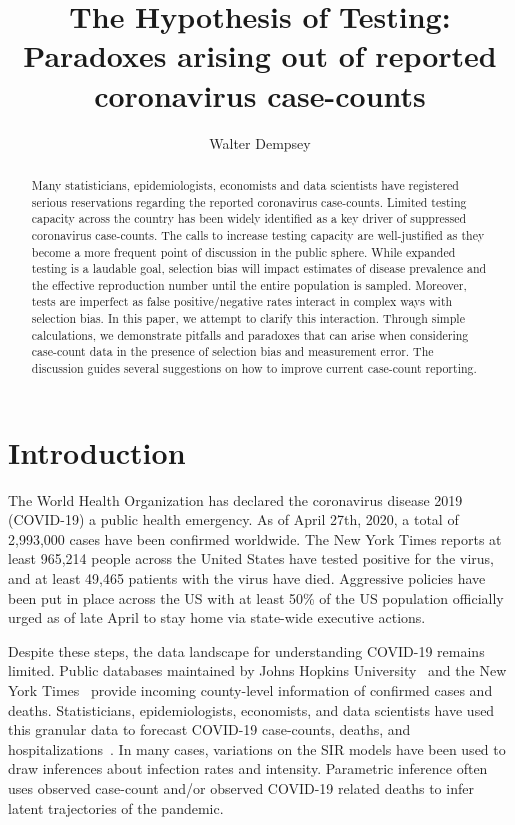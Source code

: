\documentclass[aoas]{amsart}
\begin{document}
\title[The Hypothesis of Testing]{The Hypothesis of Testing: Paradoxes arising out of reported coronavirus case-counts} %

\author{Walter Dempsey}
\address{Department of Biostatistics, University of Michigan, Ann Arbor, MI 48109}

\begin{abstract}
Many statisticians, epidemiologists, economists and data scientists have registered serious reservations regarding the reported coronavirus case-counts. Limited testing capacity across the country has been widely identified as a key driver of suppressed coronavirus case-counts.  The calls to increase testing capacity are well-justified as they become a more frequent point of discussion in the public sphere.  While expanded testing is a laudable goal, selection bias will impact estimates of disease prevalence and the effective reproduction number until the entire population is sampled.  Moreover, tests are imperfect as false positive/negative rates interact in complex ways with selection bias.  In this paper, we attempt to clarify this interaction.  Through simple calculations, we demonstrate pitfalls and paradoxes that can arise when considering case-count data in the presence of selection bias and measurement error. The discussion guides several suggestions on how to improve current case-count reporting.
\end{abstract}

\maketitle


\section{Introduction}
The World Health Organization has declared the coronavirus disease 2019 (COVID-19) a public health emergency.  As of April 27th, 2020, a total of 2,993,000 cases have been confirmed worldwide.  The New York Times reports at least 965,214 people across the United States have tested positive for the virus, and at least 49,465 patients with the virus have died.  Aggressive policies have been put in place across the US with at least 50\% of the US population officially urged as of late April to stay home via state-wide executive actions.

Despite these steps, the data landscape for understanding COVID-19 remains limited.  Public databases maintained by Johns Hopkins University~\citep{JHU_Lancet} and the New York Times~\cite{NYT} provide incoming county-level information of confirmed cases and deaths.  Statisticians, epidemiologists, economists, and data scientists have used this granular data to forecast COVID-19 case-counts, deaths, and hospitalizations~\citep{Song2020,Ray2020,2020.IHME}.  In many cases, variations on the SIR models have been used to draw inferences about infection rates and intensity.  Parametric inference often uses observed case-count and/or observed COVID-19 related deaths to infer latent trajectories of the pandemic.
\end{document}
